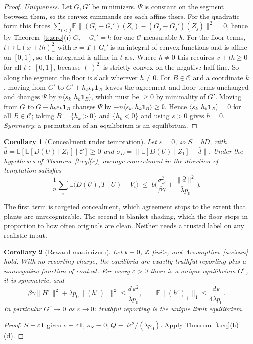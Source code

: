 \documentclass[11pt]{article}
\newtheorem{corollary}{Corollary}
\theoremstyle{definition}
\theoremstyle{remark}
\newcommand{\E}{\mathbb{E}}
\newcommand{\cC}{\mathcal{C}}
\newcommand{\cZ}{\mathcal{Z}}
\newcommand{\ip}[2]{\langle #1,#2\rangle}
\newcommand{\norm}[1]{\lVert #1\rVert}
\newcommand{\negp}[1]{(#1)_{-}}
\newcommand{\posp}[1]{(#1)_{+}}
\newcommand{\lbar}{\bar\lambda}
\begin{document}
\begin{proof}
\emph{Uniqueness.} Let $G,G'$ be minimizers. $\Psi$ is constant on the segment between them, so its convex summands are each affine there. For the quadratic form this forces $\sum_{i<j}\E\norm{(G_i-G_i')(Z_i)-(G_j-G_j')(Z_j)}^2=0$, hence by Theorem~\ref{t:zero}(i) $G_i-G_i'=h$ for one $\cC$-measurable $h$. For the floor terms, $t\mapsto\E\negp{x+th}^2$ with $x=T+G_i'$ is an integral of convex functions and is affine on $[0,1]$, so the integrand is affine in $t$ a.s. Where $h\ne0$ this requires $x+th\ge0$ for all $t\in[0,1]$, because $\negp{\cdot}^2$ is strictly convex on the negative half-line. So along the segment the floor is slack wherever $h\ne0$. For $B\in\cC$ and a coordinate $k$, moving from $G'$ to $G'+h_k e_k\mathbf 1_B$ leaves the agreement and floor terms unchanged and changes $\Psi$ by $n\ip{\bar s_k}{h_k\mathbf 1_B}$, which must be $\ge0$ by minimality of $G'$. Moving from $G$ to $G-h_ke_k\mathbf 1_B$ changes $\Psi$ by $-n\ip{\bar s_k}{h_k\mathbf 1_B}\ge0$. Hence $\ip{\bar s_k}{h_k\mathbf 1_B}=0$ for all $B\in\cC$; taking $B=\{h_k>0\}$ and $\{h_k<0\}$ and using $\bar s>0$ gives $h=0$. \emph{Symmetry}: a permutation of an equilibrium is an equilibrium.
\end{proof}

\begin{corollary}[Concealment under temptation]\label{c:conceal}
Let $\varepsilon=0$, so $S=bD$, with $\bar d=\E[\E[D(U)\mid Z_1]\mid\cC]\ge0$ and $\sigma_D=\norm{\E[D(U)\mid Z_1]-\bar d}$. Under the hypotheses of Theorem~\ref{t:eq}(c), average concealment in the direction of temptation satisfies
\[
\frac1n\sum_i\E\ip{D(U)}{T(U)-V_i}\;\le\;b\Big(\frac{\sigma_D^2}{\beta\gamma}+\frac{\norm{\bar d}^2}{\lbar p_0}\Big).
\]
\end{corollary}

The first term is targeted concealment, which agreement stops to the extent that plants are unrecognizable. The second is blanket shading, which the floor stops in proportion to how often originals are clean. Neither needs a trusted label on any realistic input.

\begin{corollary}[Reward maximizers]\label{c:rm}
Let $b=0$, $\cZ$ finite, and Assumption~\ref{a:clean} hold. With no reporting charge, the equilibria are exactly truthful reporting plus a nonnegative function of context. For every $\varepsilon>0$ there is a unique equilibrium $G^\varepsilon$, it is symmetric, and
\[
\beta\gamma\norm{H^\varepsilon}^2+\lbar p_0\norm{\negp{h^\varepsilon}}^2\le\frac{d\,\varepsilon^2}{\lbar p_0},\qquad \E\norm{\posp{h^\varepsilon}}_1\le\frac{d\,\varepsilon}{4\lbar p_0}.
\]
In particular $G^\varepsilon\to0$ as $\varepsilon\to0$: truthful reporting is the unique limit equilibrium.
\end{corollary}
\begin{proof}
$S=\varepsilon\mathbf 1$ gives $\bar s=\varepsilon\mathbf 1$, $\sigma_S=0$, $Q=d\varepsilon^2/(\lbar p_0)$. Apply Theorem~\ref{t:eq}(b)--(d).
\end{proof}
\end{document}
